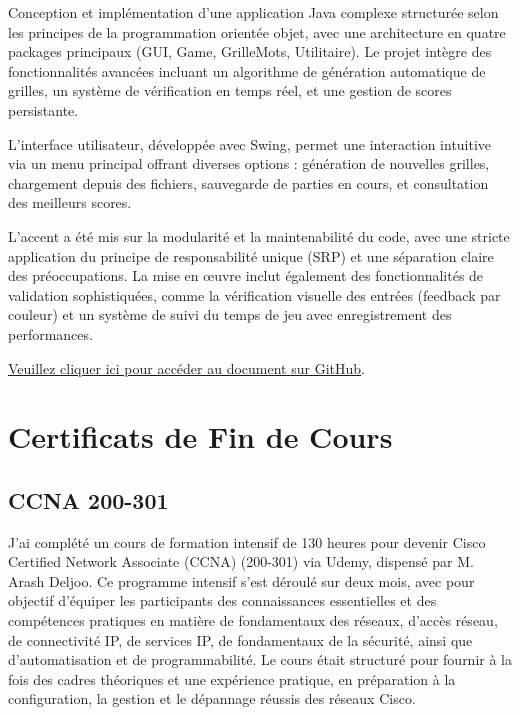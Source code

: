 \documentclass{article}
\begin{document}
    Conception et implémentation d'une application Java complexe structurée selon les principes de la programmation orientée objet, avec une architecture en quatre packages principaux (GUI, Game, GrilleMots, Utilitaire). Le projet intègre des fonctionnalités avancées incluant un algorithme de génération automatique de grilles, un système de vérification en temps réel, et une gestion de scores persistante.

    L'interface utilisateur, développée avec Swing, permet une interaction intuitive via un menu principal offrant diverses options : génération de nouvelles grilles, chargement depuis des fichiers, sauvegarde de parties en cours, et consultation des meilleurs scores.

    L'accent a été mis sur la modularité et la maintenabilité du code, avec une stricte application du principe de responsabilité unique (SRP) et une séparation claire des préoccupations. La mise en œuvre inclut également des fonctionnalités de validation sophistiquées, comme la vérification visuelle des entrées (feedback par couleur) et un système de suivi du temps de jeu avec enregistrement des performances.
    \newline
    \newline
    \newline

    \href{https://github.com/jafarizadeh/CV---lettre/tree/2c50806438650ea894402f5cec3c73276cccaadc/Document/Projets/Crossword%20Grid%20Generator%20and%20Display}{Veuillez cliquer ici pour accéder au document sur GitHub}.
    
   
    

    

    \newpage


\section{Certificats de Fin de Cours}

    \subsection{CCNA 200-301}

    J'ai complété un cours de formation intensif de 130 heures pour devenir Cisco Certified Network Associate (CCNA) (200-301) via Udemy, dispensé par M. Arash Deljoo. Ce programme intensif s'est déroulé sur deux mois, avec pour objectif d'équiper les participants des connaissances essentielles et des compétences pratiques en matière de fondamentaux des réseaux, d'accès réseau, de connectivité IP, de services IP, de fondamentaux de la sécurité, ainsi que d'automatisation et de programmabilité. Le cours était structuré pour fournir à la fois des cadres théoriques et une expérience pratique, en préparation à la configuration, la gestion et le dépannage réussis des réseaux Cisco.
\end{document}
